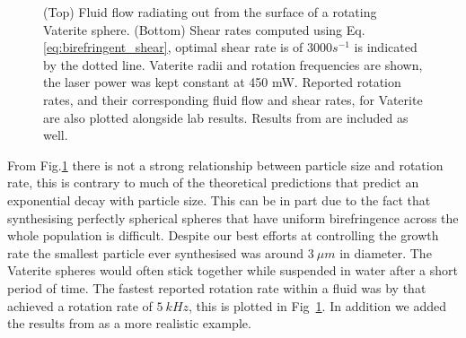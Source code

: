 \begin{figure}[h!]
\begin{subfigure}{0.7\linewidth}
		\caption{}
	\end{subfigure}
	\caption{(Top) Fluid flow radiating out from the surface of a
		rotating Vaterite sphere. (Bottom) Shear rates computed 
		using Eq.\ref{eq:birefringent_shear}, optimal shear rate is 
		of $3000 s^{-1}$ is indicated by the dotted line. Vaterite 
		radii and rotation frequencies are shown, the laser power 
		was kept constant at 450 mW. Reported rotation rates, and 
		their corresponding fluid flow and shear rates, for Vaterite 
		are also plotted alongside lab results. Results from 
		\cite{Parkin2009, Arita2016} are included as well.}
	\label{fig:vaterite_shear}
\end{figure}

From Fig.\ref{fig:vaterite_shear} there is not a strong relationship 
between particle size and rotation rate, this is contrary to much of 
the theoretical predictions that predict an exponential decay with 
particle size. This can be in part due to the fact that synthesising 
perfectly spherical spheres that have uniform birefringence across the 
whole population is difficult. Despite our best efforts at controlling 
the growth rate the smallest particle ever synthesised was around $3\ 
\mu m$ in diameter. The Vaterite spheres would often stick together 
while suspended in water after a short period of time. The fastest 
reported rotation rate within a fluid was by \cite{Arita2016} 
that achieved a rotation rate of $5\ kHz$, this is plotted in Fig~\ref{fig:vaterite_shear}. In addition we added the results from 
\cite{Parkin2009} as a more realistic example. 

